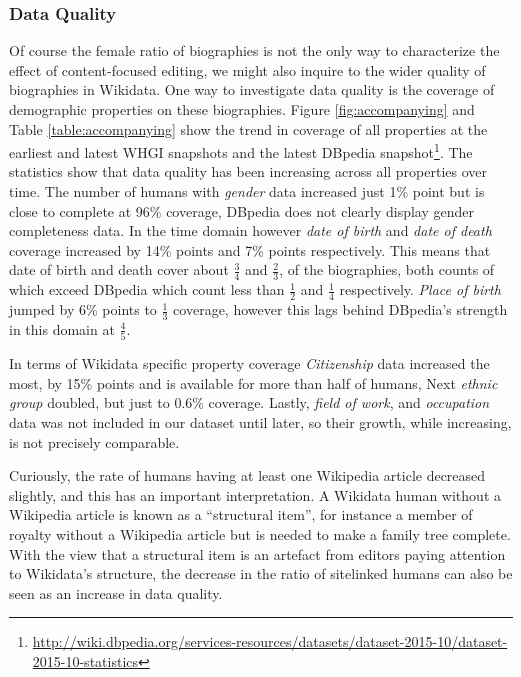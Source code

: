 \documentclass{sig-alternate-05-2015}
\begin{document}
\subsubsection{Data Quality}
Of course the female ratio of biographies is not the only way to characterize the effect of content-focused editing, we might also inquire to the wider quality of biographies in Wikidata. One way to investigate data quality is the coverage of demographic  properties on these biographies. Figure \ref{fig:accompanying} and Table \ref{table:accompanying} show the trend in coverage of all properties at the earliest and latest WHGI snapshots and the latest DBpedia snapshot\footnote{\url{http://wiki.dbpedia.org/services-resources/datasets/dataset-2015-10/dataset-2015-10-statistics}}. The statistics show that data quality has been increasing across all properties over time. The number of humans with \textit{gender} data increased just 1\% point but is close to complete at 96\% coverage, DBpedia does not clearly display gender completeness data. In the time domain however \textit{date of birth} and \textit{date of death} coverage increased by 14\% points and 7\% points respectively. This means that date of birth and death cover about $\frac{3}{4}$ and $\frac{2}{3}$, of the biographies, both counts of which exceed DBpedia which count less than $\frac{1}{2}$ and $\frac{1}{4}$ respectively. \textit{Place of birth} jumped by 6\% points to $\frac{1}{3}$ coverage, however this lags behind DBpedia's strength in this domain at $\frac{4}{5}$.

In terms of Wikidata specific property coverage \textit{Citizenship} data increased the most, by 15\% points and is available for more than half of humans, Next \textit{ethnic group} doubled, but just to 0.6\% coverage. Lastly, \textit{field of work}, and \textit{occupation} data was not included in our dataset until later, so their growth, while increasing, is not precisely comparable.


Curiously, the rate of humans having at least one Wikipedia article decreased slightly, and this has an important interpretation. A Wikidata human without a Wikipedia article is known as a ``structural item'', for instance a member of royalty without a Wikipedia article but is needed to make a family tree complete. With the view that a structural item is an artefact from editors paying attention to Wikidata's structure, the decrease in the ratio of sitelinked humans can also be seen as an increase in data quality. 
\end{document}
